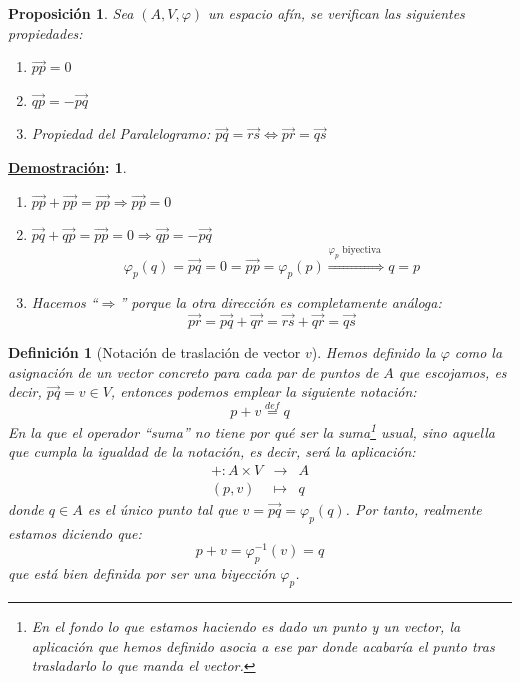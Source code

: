 \documentclass[10pt,a4paper,openright]{book}
\theoremstyle{break}
\newtheorem*{defi}{Definición}
\newtheorem*{prop}{Proposición}
\newtheorem*{demo}{\underline{Demostración}:}
\begin{document}
\begin{prop}
Sea $(A,V,\varphi)$ un espacio afín, se verifican las siguientes propiedades:
\begin{enumerate}
\item $\vec{pp} = 0$
\item $\vec{qp} = - \vec{pq}$
\item Propiedad del Paralelogramo: $\vec{pq} = \vec{rs} \Leftrightarrow \vec{pr} = \vec{qs}$ 
\end{enumerate}
\end{prop}
\begin{demo}
\begin{enumerate}
\item $\vec{pp} + \vec{pp} = \vec{pp} \Rightarrow \vec{pp} = 0$

\item $\vec{pq} + \vec{qp} = \vec{pp} = 0 \Rightarrow \vec{qp}=-\vec{pq}$
$$\varphi_p(q) = \vec{pq} = 0 = \vec{pp} = \varphi_p (p) \overset{\varphi_p \mbox{ biyectiva }}{\Rightarrow} q = p$$

\item Hacemos ``$\Rightarrow$'' porque la otra dirección es completamente análoga:
$$\vec{pr} = \vec{pq} + \vec{qr} = \vec{rs} + \vec{qr} = \vec{qs}$$
\end{enumerate}
\end{demo}

\begin{defi}[Notación de traslación de vector $v$]
Hemos definido la $\varphi$ como la asignación de un vector concreto para cada par de puntos de $A$ que escojamos, es decir, $\vec{pq} = v \in V$, entonces podemos emplear la siguiente notación:
$$p + v \overset{def}{=} q$$
En la que el operador ``suma'' no tiene por qué ser la suma\footnote{
En el fondo lo que estamos haciendo es dado un punto y un vector, la aplicación que hemos definido asocia a ese par donde acabaría el punto tras trasladarlo lo que manda el vector.} usual, sino aquella que cumpla la igualdad de la notación, es decir, será la aplicación:
\begin{eqnarray*}
+ : A \times V &\longrightarrow& A \\ (p,v) &\longmapsto& q
\end{eqnarray*}
donde $q \in A$ es el único punto tal que $v = \vec{pq} = \varphi_p(q)$. Por tanto, realmente estamos diciendo que:
$$\boxed{p+v = \varphi_p^{-1}(v) = q}$$
que está bien definida por ser una biyección $\varphi_p$.
\end{defi}
\end{document}
